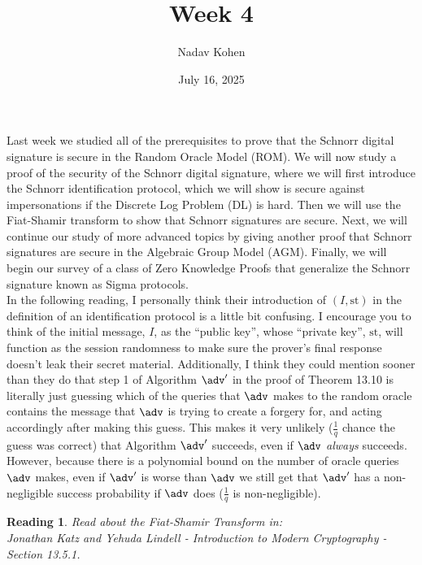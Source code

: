 \documentclass[12pt]{article}
\newtheorem{reading}{Reading}
\theoremstyle{definition}
\theoremstyle{remark}
\theoremstyle{definition}
\begin{document}
\title{Week 4}
\author{Nadav Kohen}
\date{July 16, 2025}
\maketitle

Last week we studied all of the prerequisites to prove that the Schnorr digital signature is secure in the Random Oracle Model (ROM). We will now study a proof of the security of the Schnorr digital signature, where we will first introduce the Schnorr identification protocol, which we will show is secure against impersonations if the Discrete Log Problem (DL) is hard. Then we will use the Fiat-Shamir transform to show that Schnorr signatures are secure. Next, we will continue our study of more advanced topics by giving another proof that Schnorr signatures are secure in the Algebraic Group Model (AGM). Finally, we will begin our survey of a class of Zero Knowledge Proofs that generalize the Schnorr signature known as Sigma protocols.\\

In the following reading, I personally think their introduction of $(I, \text{st})$ in the definition of an identification protocol is a little bit confusing. I encourage you to think of the initial message, $I$, as the ``public key'', whose ``private key'', $\text{st}$, will function as the session randomness to make sure the prover's final response doesn't leak their secret material. Additionally, I think they could mention sooner than they do that step 1 of Algorithm $\adv'$ in the proof of Theorem 13.10 is literally just guessing which of the queries that $\adv$ makes to the random oracle contains the message that $\adv$ is trying to create a forgery for, and acting accordingly after making this guess. This makes it very unlikely ($\frac{1}{q}$ chance the guess was correct) that Algorithm $\adv'$ succeeds, even if $\adv$ \emph{always} succeeds. However, because there is a polynomial bound on the number of oracle queries $\adv$ makes, even if $\adv'$ is worse than $\adv$ we still get that $\adv'$ has a non-negligible success probability if $\adv$ does ($\frac{1}{q}$ is non-negligible).

\begin{reading}
Read about the Fiat-Shamir Transform in:\\
Jonathan Katz and Yehuda Lindell - Introduction to Modern Cryptography - Section 13.5.1.
\end{reading}
\end{document}
